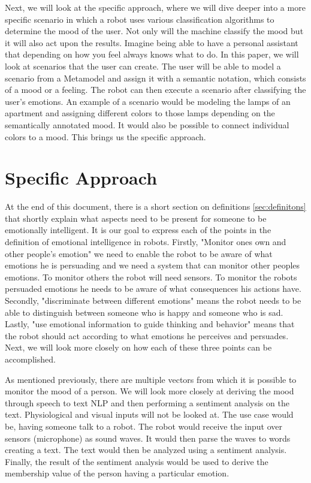 \documentclass{lncs}
\begin{document}
Next, we will look at the specific approach, where we will dive deeper into a more specific scenario in which a robot uses various classification algorithms to determine the mood of the user. Not only will the machine classify the mood but it will also act upon the results. Imagine being able to have a personal assistant that depending on how you feel always knows what to do. In this paper, we will look at scenarios that the user can create. The user will be able to model a scenario from a Metamodel and assign it with a semantic notation, which consists of a mood or a feeling. The robot can then execute a scenario after classifying the user's emotions. An example of a scenario would be modeling the lamps of an apartment and assigning different colors to those lamps depending on the semantically annotated mood. It would also be possible to connect individual colors to a mood. This brings us the specific approach.

\section{Specific Approach}\label{sec:specific_approach}

At the end of this document, there is a short section on definitions \ref{sec:definitons} that shortly explain what aspects need to be present for someone to be emotionally intelligent. It is our goal to express each of the points in the definition of emotional intelligence in robots. Firstly, "Monitor ones own and other people's emotion" we need to enable the robot to be aware of what emotions he is persuading and we need a system that can monitor other peoples emotions. To monitor others the robot will need sensors. To monitor the robots persuaded emotions he needs to be aware of what consequences his actions have. Secondly, "discriminate between different emotions" means the robot needs to be able to distinguish between someone who is happy and someone who is sad. Lastly, "use emotional information to guide thinking and behavior" means that the robot should act according to what emotions he perceives and persuades. Next, we will look more closely on how each of these three points can be accomplished.

As mentioned previously, there are multiple vectors from which it is possible to monitor the mood of a person. We will look more closely at deriving the mood through speech to text NLP and then performing a sentiment analysis on the text. Physiological and visual inputs will not be looked at. The use case would be, having someone talk to a robot. The robot would receive the input over sensors (microphone) as sound waves. It would then parse the waves to words creating a text. The text would then be analyzed using a sentiment analysis. Finally, the result of the sentiment analysis would be used to derive the membership value of the person having a particular emotion.
\end{document}
